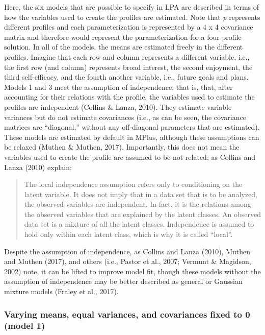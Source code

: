 \documentclass[]{book}
\theoremstyle{definition}
\theoremstyle{definition}
\theoremstyle{definition}
\theoremstyle{remark}
\begin{document}
Here, the six models that are possible to specify in LPA are described
in terms of how the variables used to create the profiles are estimated.
Note that \emph{p} represents different profiles and each
parameterization is represented by a 4 x 4 covariance matrix and
therefore would represent the parameterization for a four-profile
solution. In all of the models, the means are estimated freely in the
different profiles. Imagine that each row and column represents a
different variable, i.e., the first row (and column) represents broad
interest, the second enjoyment, the third self-efficacy, and the fourth
another variable, i.e., future goals and plans. Models 1 and 3 meet the
assumption of independence, that is, that, after accounting for their
relations with the profile, the variables used to estimate the profiles
are independent (Collins \& Lanza, 2010). They estimate variable
variances but do not estimate covariances (i.e., as can be seen, the
covariance matrices are ``diagonal,'' without any off-diagonal
parameters that are estimated). These models are estimated by default in
MPlus, although these assumptions can be relaxed (Muthen \& Muthen,
2017). Importantly, this does not mean the variables used to create the
profile are assumed to be not related; as Collins and Lanza (2010)
explain:

\begin{quote}
The local independence assumption refers only to conditioning on the
latent variable. It does not imply that in a data set that is to be
analyzed, the observed variables are independent. In fact, it is the
relations among the observed variables that are explained by the latent
classes. An observed data set is a mixture of all the latent classes.
Independence is assumed to hold only within each latent class, which is
why it is called ``local''.
\end{quote}

Despite the assumption of independence, as Collins and Lanza (2010),
Muthen and Muthen (2017), and others (i.e., Pastor et al., 2007; Vermunt
\& Magidson, 2002) note, it can be lifted to improve model fit, though
these models without the assumption of independence may be better
described as general or Gaussian mixture models (Fraley et al., 2017).

\subsubsection{Varying means, equal variances, and covariances fixed to
0 (model
1)}\label{varying-means-equal-variances-and-covariances-fixed-to-0-model-1}
\end{document}
